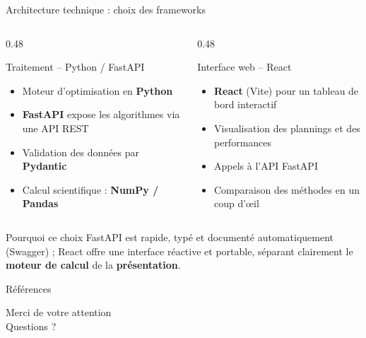 \documentclass[aspectratio=169,11pt]{beamer}
\begin{document}
\begin{frame}{Architecture technique : choix des frameworks}
  \begin{columns}[T]
    \begin{column}{0.48\textwidth}
      \begin{block}{Traitement -- Python / FastAPI}
        \small
        \begin{itemize}
          \item Moteur d'optimisation en \textbf{Python}
          \item \textbf{FastAPI} expose les algorithmes via une API REST
          \item Validation des données par \textbf{Pydantic}
          \item Calcul scientifique : \textbf{NumPy / Pandas}
        \end{itemize}
      \end{block}
    \end{column}
    \begin{column}{0.48\textwidth}
      \begin{block}{Interface web -- React}
        \small
        \begin{itemize}
          \item \textbf{React} (Vite) pour un tableau de bord interactif
          \item Visualisation des plannings et des performances
          \item Appels à l'API FastAPI
          \item Comparaison des méthodes en un coup d'œil
        \end{itemize}
      \end{block}
    \end{column}
  \end{columns}
  \vspace{0.2em}
  \begin{alertblock}{\footnotesize Pourquoi ce choix}
    \footnotesize FastAPI est rapide, typé et documenté automatiquement
    (Swagger) ; React offre une interface réactive et portable, séparant
    clairement le \textbf{moteur de calcul} de la \textbf{présentation}.
  \end{alertblock}
\end{frame}

\nocite{*}
\begin{frame}{Références}
  \footnotesize
  \printbibliography[heading=none]
\end{frame}

{
\begin{frame}
  \begin{center}
    \Large
    Merci de votre attention\\[0.5em]
    Questions ?
  \end{center}
\end{frame}
}
\end{document}

